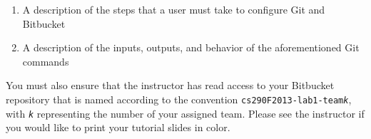 \begin{enumerate}
	
	\item A description of the steps that a user must take to configure Git and Bitbucket

	\item A description of the inputs, outputs, and behavior of the aforementioned Git commands

\end{enumerate}

You must also ensure that the instructor has read access to your Bitbucket repository that is named according to the
convention {\tt cs290F2013-lab1-team{\em k}}, with {\tt {\em k}} representing the number of your assigned team. Please
see the instructor if you would like to print your tutorial slides in color.


